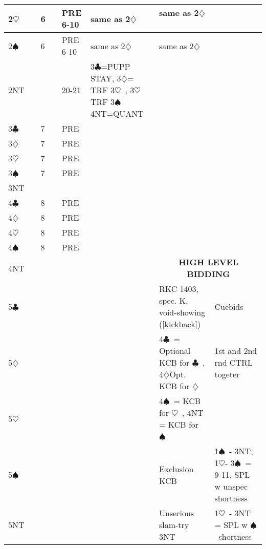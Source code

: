 \documentclass{article}
\newcommand\C{\ensuremath{\clubsuit}}
\newcommand\D{\ensuremath{\diamondsuit}}
\renewcommand\H{\ensuremath{\heartsuit}}
\renewcommand\S{\ensuremath{\spadesuit}}
\newcommand\N{{\footnotesize NT}}
\begin{document}
\begin{tabular}{| p{9mm} | p{6mm} | p{9mm} | p{9mm} | p{30mm} | p{80mm} | p{62mm} | p{46mm} |}
	2\H & &6 & &PRE 6-10 &same as 2\D\ &same as 2\D\ & \\ \hline
	2\S & &6 & &PRE 6-10 &same as 2\D\ &same as 2\D\ & \\ \hline
	2\N & & & &20-21 & 3\C =PUPP STAY, 3\D= TRF 3\H\ , 3\H\= TRF 3\S\, 4NT=QUANT & & \\ \hline
	3\C & &7 & &PRE & & & \\ \hline
	3\D & &7 & &PRE & & & \\ \hline
	3\H & &7 & &PRE & & & \\ \hline
	3\S & &7 & &PRE & & & \\ \hline
	3\N & & & & & & & \\ \hline
	4\C & &8 & &PRE & & & \\ \hline
	4\D & &8 & &PRE & & & \\ \hline
	4\H & &8 & &PRE & & & \\ \hline
	4\S & &8 & &PRE & & & \\ \hline
        4\N & & & & & &\multicolumn{2}{c}{\cellcolor[gray]{0.9} \textbf{HIGH LEVEL BIDDING}} \\ \hline
        5\C & & & & & &RKC 1403, spec. K, void-showing (\ref{kickback})   & Cuebids\\ \hline
        5\D & & & & & & 4\C\ = Optional KCB for \C\ , 4\D\= Opt. KCB for \D\  & 1st and 2nd rnd CTRL togeter \\ \hline
	5\H & & & & & &4\S\ = KCB for \H\ , 4NT = KCB for \S\  & \\ \hline
	5\S & & & & & &Exclusion KCB  & 1\S\ - 3NT, 1\H - 3\S\  = 9-11, SPL w unspec shortness \\ \hline
	5\N & & & & & &Unserious slam-try 3NT & 1\H\ - 3NT = SPL w \S\ shortness\\ \hline
\end{tabular}

\noindent
\end{document}
